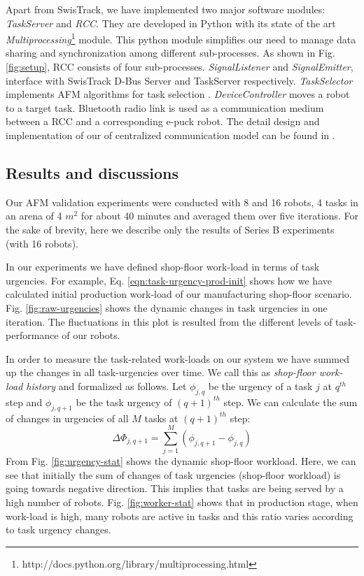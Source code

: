 \documentclass{intech}
\begin{document}
Apart from SwisTrack, we have implemented two major software modules: {\em TaskServer} and {\em RCC}. They are developed in Python with its state of the art \textit{Multiprocessing}\footnote{http://docs.python.org/library/multiprocessing.html} module. This python module simplifies our need to manage data sharing and synchronization among different sub-processes. As shown in Fig. \ref{fig:setup}, RCC consists of four sub-processes. {\em SignalListener} and {\em SignalEmitter}, interface with SwisTrack D-Bus Server and TaskServer respectively. {\em TaskSelector} implements AFM algorithms for task selection . {\em DeviceController} moves a robot to a target task. Bluetooth radio link is used as a communication medium between a RCC and a corresponding e-puck robot. The detail design and implementation  of our of centralized communication model can be found in \citep{Sarker2010control}. 
\subsection{Results and discussions}
\label{validation:results}
Our AFM validation experiments were conducted with 8 and 16 robots, 4 tasks in an arena of 4 $m^2$ for about 40 minutes and averaged them over five iterations. For the sake of brevity, here we describe only the results of Series B experiments (with 16 robots).

In our experiments we have defined shop-floor work-load in terms of task urgencies. For example, Eq. \ref{eqn:task-urgency-prod-init} shows how we have calculated initial production work-load of our manufacturing shop-floor scenario. Fig. \ref{fig:raw-urgencies} shows the dynamic changes in task urgencies in one iteration. The fluctuations in this plot is resulted from the different levels of task-performance of our robots.

In order to measure the task-related work-loads on our system we have summed up the changes in all task-urgencies over time. We call this as {\em shop-floor work-load history} and formalized as follows. Let $ \phi_{j, q}$ be the urgency of a task $j$ at $q^{th}$ step and $\phi_{j, q+1}$ be the task urgency of $(q+1)^{th}$ step. We can calculate the sum of changes in urgencies of all $M$ tasks at $(q+1)^{th}$ step:
\begin{equation} 
\Delta \Phi_{j, q+1} = \sum_{j=1}^{M} (\phi_{j, q+1} - \phi_{j, q})
\label{eqn:Delta-Phi}
\end{equation}
From Fig. \ref{fig:urgency-stat} shows the dynamic shop-floor workload. Here, we can see that initially the sum of changes of task urgencies (shop-floor workload) is going towards negative direction. This implies that tasks are being served by a high number of robots.  Fig. \ref{fig:worker-stat} shows that in production stage, when  work-load is high, many robots are active in tasks and this ratio varies according to task urgency changes.
\end{document}
